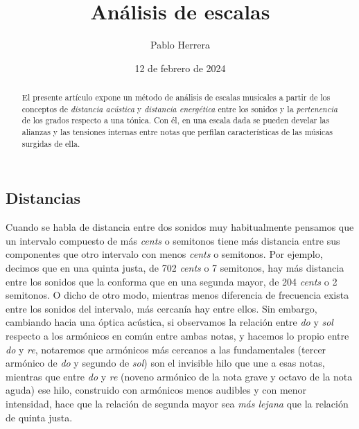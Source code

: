 \documentclass[a4paper,10pt]{article}
\begin{document}
\title{Análisis de escalas}
\author{Pablo Herrera}
\date{12 de febrero de 2024}
\maketitle
\begin{abstract}
El presente artículo expone un método de análisis de escalas musicales a partir de los conceptos de \emph{distancia acústica} y \emph{distancia energética} entre los sonidos y la \emph{pertenencia} de los grados respecto a una tónica. Con él, en una escala dada se pueden develar las alianzas y las tensiones internas entre notas que perfilan características de las músicas surgidas de ella.
\end{abstract}
\tableofcontents
\newpage
\begin{multicols}{2}
\section{Distancias}\label{sec:distancias}

  Cuando se habla de distancia entre dos sonidos muy habitualmente pensamos que un intervalo compuesto de más \emph{cents} o semitonos tiene más distancia entre sus componentes que otro intervalo con menos \emph{cents} o semitonos. Por ejemplo, decimos que en una quinta justa, de 702 \emph{cents} o 7 semitonos, hay más distancia entre los sonidos que la conforma que en una segunda mayor, de 204 \emph{cents} o 2 semitonos. O dicho de otro modo, mientras menos diferencia de frecuencia exista entre los sonidos del intervalo, más cercanía hay entre ellos. Sin embargo, cambiando hacia una óptica acústica, si observamos la relación entre \emph{do} y \emph{sol} respecto a los armónicos en común entre ambas notas, y hacemos lo propio entre \emph{do} y \emph{re}, notaremos que armónicos más cercanos a las fundamentales (tercer armónico de \emph{do} y segundo de \emph{sol}) son el invisible hilo que une a esas notas, mientras que entre \emph{do} y \emph{re} (noveno armónico de la nota grave y octavo de la nota aguda) ese hilo, construido con armónicos menos audibles y con menor intensidad, hace que la relación de segunda mayor sea \emph{más lejana} que la relación de quinta justa.


\end{multicols}
\end{document}
